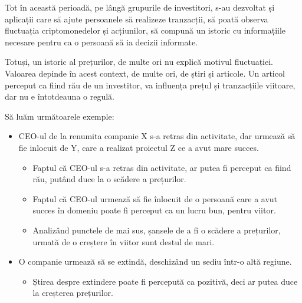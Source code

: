 Tot în această perioadă, pe lângă grupurile de investitori, s-au dezvoltat și aplicații care să ajute persoanele să realizeze tranzacții, să poată observa fluctuația criptomonedelor și acțiunilor,
să compună un istoric cu informațiile necesare pentru ca o persoană să ia decizii informate.

Totuși, un istoric al prețurilor, de multe ori nu explică motivul fluctuației. Valoarea depinde în acest context, de multe ori, de știri și articole.
Un articol perceput ca fiind rău de un investitor, va influența prețul și tranzacțiile viitoare, dar nu e întotdeauna o regulă.

Să luăm următoarele exemple:
\vspace{2mm}
\begin{itemize}
	\item CEO-ul de la renumita companie X s-a retras din activitate, dar urmează să fie inlocuit de Y, care a realizat proiectul Z ce a avut mare succes. 
	\begin{itemize}
		\item Faptul că CEO-ul s-a retras din activitate, ar putea fi perceput ca fiind rău, putând duce la o scădere a prețurilor.
	\end{itemize}
	\begin{itemize}
		\item Faptul că CEO-ul urmează să fie înlocuit de o persoană care a avut succes în domeniu poate fi perceput ca un lucru bun, pentru viitor.
	\end{itemize}
	\begin{itemize}
		\item Analizând punctele de mai sus, șansele de a fi o scădere a prețurilor, urmată de o creștere în viitor sunt destul de mari.
	\end{itemize}
\end{itemize}

\vspace{2mm}

\begin{itemize}
	\item O companie urmează să se extindă, deschizând un sediu într-o altă regiune.
	\begin{itemize}
		\item Știrea despre extindere poate fi percepută ca pozitivă, deci ar putea duce la creșterea prețurilor.
	\end{itemize}
\end{itemize}

\vspace{2mm}

